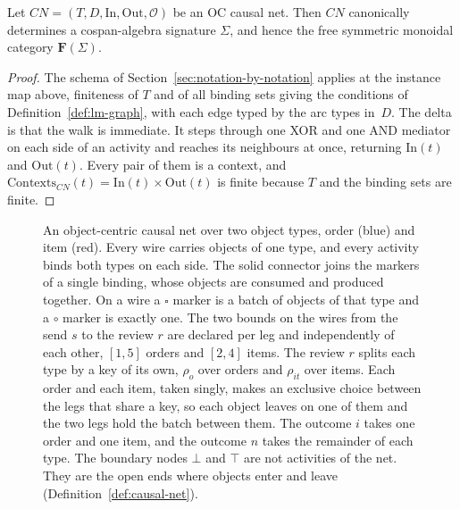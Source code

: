\begin{theorem}
  \label{thm:causal-to-cospan-signature}
  Let $CN = (T, D, \mathrm{In}, \mathrm{Out}, \mathcal{O})$ be an OC causal net. Then $CN$ canonically determines a cospan-algebra signature $\Sigma$, and hence the free symmetric monoidal category $\mathbf{F}(\Sigma)$.
\end{theorem}

\begin{proof}
  The schema of Section~\ref{sec:notation-by-notation} applies at the instance map above,
  finiteness of $T$ and of all binding sets giving the conditions of
  Definition~\ref{def:lm-graph}, with each edge typed by the arc types in~$D$. The delta is that
  the walk is immediate. It steps through one XOR and one AND mediator on each side of an activity and
  reaches its neighbours at once, returning $\mathrm{In}(t)$ and $\mathrm{Out}(t)$. Every pair
  of them is a context, and
  $\mathrm{Contexts}_{CN}(t)=\mathrm{In}(t)\times \mathrm{Out}(t)$ is finite because $T$ and
  the binding sets are finite.
\end{proof}

\begin{figure}[tp]
  \centering
  \unskip
  \caption{An object-centric causal net over two object types, order (blue) and item (red).
    Every wire carries objects of one type, and every activity binds both types on each
    side. The solid connector joins the markers of a single binding, whose objects are
    consumed and produced together. On a wire a $\square$ marker is a batch of objects of
    that type and a $\circ$ marker is exactly one. The two bounds on the wires from the
    send $s$ to the review $r$ are declared per leg and independently of each other,
    $[1,5]$ orders and $[2,4]$ items. The review $r$ splits each type by a key of its own,
    $\rho_{o}$ over orders and $\rho_{it}$ over items. Each order and each item, taken singly,
    makes an exclusive choice between the legs that share a key, so each object leaves on one of
    them and the two legs hold the batch between them. The outcome $i$ takes one order and one
    item, and the outcome $n$ takes the remainder of each type. The boundary nodes $\bot$ and
    $\top$ are not activities of the net. They are the open ends where objects enter and leave
    (Definition~\ref{def:causal-net}).}
  \label{fig:re-occn}
\end{figure}

